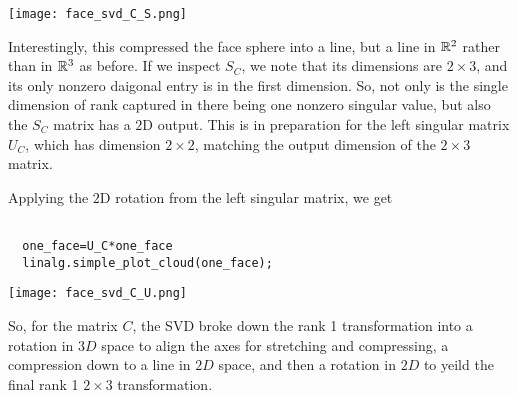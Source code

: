 \documentclass{ximera}
\begin{document}
\begin{center}
  \texttt{[image: face\_svd\_C\_S.png]}
\end{center}

Interestingly, this compressed the face sphere into a line, but a line in $\mathbb{R}^2$ rather than in $\mathbb{R}^3$ as before. If we inspect $S_C$, we note that its dimensions are $2\times 3$, and its only nonzero daigonal entry is in the first dimension. So, not only is the single dimension of rank captured in there being one nonzero singular value, but also the $S_C$ matrix has a $2$D output. This is in preparation for the left singular matrix $U_C$, which has dimension $2\times 2$, matching the output dimension of the $2\times 3$ matrix. 

Applying the $2$D rotation from the left singular matrix, we get

\begin{verbatim}

  one_face=U_C*one_face
  linalg.simple_plot_cloud(one_face);

\end{verbatim}

\begin{center}
  \texttt{[image: face\_svd\_C\_U.png]}
\end{center}

So, for the matrix $C$, the SVD broke down the rank 1 transformation into a rotation in $3D$ space to align the axes for stretching and compressing, a compression down to a line in $2D$ space, and then a rotation in $2D$ to yeild the final rank 1 $2\times 3$ transformation. 
\end{document}

